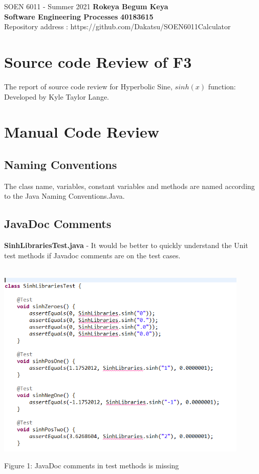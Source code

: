 \documentclass[letterpaper, 11pt]{report}
\begin{document}
\section*{}
\normalsize {SOEN 6011 - Summer 2021} \hfill \textbf{Rokeya Begum Keya} \\
\textbf{ Software Engineering Processes}  \hfill \textbf{40183615} \\
\hfill Repository address : https://github.com/Dakatsu/SOEN6011Calculator
\\
\section*{Source code Review of F3}
The report of source code review for Hyperbolic Sine, $sinh(x)$ function: Developed by Kyle Taylor Lange.
\section*{Manual Code Review}
\subsection*{Naming Conventions }
The class name, variables, constant variables and methods are named according to the Java Naming Conventions.Java.
\subsection*{JavaDoc Comments}
\textbf{SinhLibrariesTest.java} - It would be better to quickly understand the Unit test methods if Javadoc comments are on the test cases.\\\
\begin{center}
\includegraphics[width= 12cm]{F3_Code_Review_UTC}
\end{center}
\begin{center}
Figure 1: JavaDoc comments in test methods is missing 
\end{center}
\newpage
\end{document}
